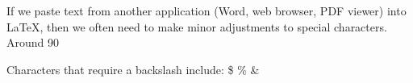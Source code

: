\documentclass{article}
\begin{document}
If we paste text from another application (Word, web browser, PDF viewer) into \LaTeX, then we often need to make minor adjustments to special characters. Around 90%

Characters that require a backslash include: \$ \% \&
\end{document}
